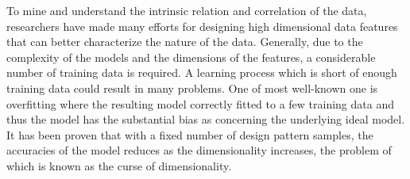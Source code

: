 \documentclass{iitthesis}
\begin{document}

To mine and understand the intrinsic relation and correlation of the data, researchers have made many efforts for designing high dimensional data features that can better characterize the nature of the data. Generally, due to the complexity of the models and the dimensions of the features, a considerable number of training data is required\cite{RS:91, KHM:83}. A learning process which is short of enough training data could result in many problems. One of most well-known one is overfitting where the resulting model correctly fitted to a few training data and thus the model has the substantial bias as concerning the underlying ideal model. It has been proven that with a fixed number of design pattern samples, the accuracies of the model reduces as the dimensionality increases\cite{HG:68}, the problem of which is known as the curse of dimensionality.
\end{document}
